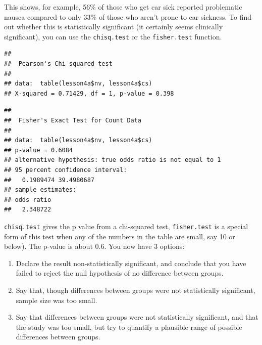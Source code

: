\documentclass[]{book}
\newenvironment{Shaded}{\begin{snugshade}}{\end{snugshade}}
\newcommand{\DataTypeTok}[1]{\textcolor[rgb]{0.13,0.29,0.53}{#1}}
\newcommand{\KeywordTok}[1]{\textcolor[rgb]{0.13,0.29,0.53}{\textbf{#1}}}
\newcommand{\NormalTok}[1]{#1}
\newcommand{\OperatorTok}[1]{\textcolor[rgb]{0.81,0.36,0.00}{\textbf{#1}}}
\newcommand{\OtherTok}[1]{\textcolor[rgb]{0.56,0.35,0.01}{#1}}
\providecommand{\tightlist}{%
  \setlength{\itemsep}{0pt}\setlength{\parskip}{0pt}}
\begin{document}
This shows, for example, 56\% of those who get car sick reported
problematic nausea compared to only 33\% of those who aren't prone to
car sickness. To find out whether this is statistically significant (it
certainly seems clinically significant), you can use the
\texttt{chisq.test} or the \texttt{fisher.test} function.

\begin{Shaded}
\end{Shaded}

\begin{verbatim}
## 
##  Pearson's Chi-squared test
## 
## data:  table(lesson4a$nv, lesson4a$cs)
## X-squared = 0.71429, df = 1, p-value = 0.398
\end{verbatim}

\begin{Shaded}
\end{Shaded}

\begin{verbatim}
## 
##  Fisher's Exact Test for Count Data
## 
## data:  table(lesson4a$nv, lesson4a$cs)
## p-value = 0.6084
## alternative hypothesis: true odds ratio is not equal to 1
## 95 percent confidence interval:
##   0.1989474 39.4980687
## sample estimates:
## odds ratio 
##   2.348722
\end{verbatim}

\texttt{chisq.test} gives the p value from a chi-squared test,
\texttt{fisher.test} is a special form of this test when any of the
numbers in the table are small, say 10 or below). The p-value is about
0.6. You now have 3 options:

\begin{enumerate}
\def\labelenumi{\arabic{enumi}.}
\tightlist
\item
  Declare the result non-statistically significant, and conclude that
  you have failed to reject the null hypothesis of no difference between
  groups.
\item
  Say that, though differences between groups were not statistically
  significant, sample size was too small.
\item
  Say that differences between groups were not statistically
  significant, and that the study was too small, but try to quantify a
  plausible range of possible differences between groups.
\end{enumerate}
\end{document}
